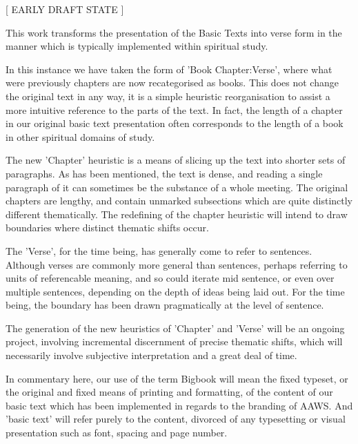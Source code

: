 \begin{fmatterchapter}


\begin{center}[ EARLY DRAFT STATE ]\end{center}

This work transforms the presentation of the Basic Texts 
    into verse form 
    in the manner which is typically implemented 
    within spiritual study.

In this instance we have taken the form of 'Book Chapter:Verse', 
    where what were previously chapters are now recategorised as books.
This does not change the original text in any way, 
    it is a simple heuristic reorganisation 
    to assist a more intuitive reference to the parts of the text.
In fact, 
    the length of a chapter in our original basic text presentation 
    often corresponds to the length of a book 
    in other spiritual domains of study.

The new 'Chapter' heuristic 
    is a means of slicing up the text into shorter sets of paragraphs.
As has been mentioned, the text is dense, 
    and reading a single paragraph of it 
    can sometimes be the substance of a whole meeting.
The original chapters are lengthy, 
    and contain unmarked subsections 
    which are quite distinctly different thematically.
The redefining of the chapter heuristic 
    will intend to draw boundaries where distinct thematic shifts occur.

The 'Verse', for the time being, has generally come to refer to sentences.
Although verses are commonly more general than sentences, 
    perhaps referring to units of referencable meaning, 
    and so could iterate mid sentence, 
    or even over multiple sentences, 
    depending on the depth of ideas being laid out.
For the time being, 
    the boundary has been drawn pragmatically at the level of sentence.

The generation of the new heuristics of 'Chapter' and 'Verse' 
    will be an ongoing project,
    involving incremental discernment of precise thematic shifts,
    which will necessarily involve subjective interpretation
    and a great deal of time.

In commentary here, our use of the term Bigbook will mean the fixed typeset, or the original and fixed means of printing and formatting, of the content of our basic text which has been implemented in regards to the branding of AAWS. And 'basic text' will refer purely to the content, divorced of any typesetting or visual presentation such as font, spacing and page number.


\end{fmatterchapter}
